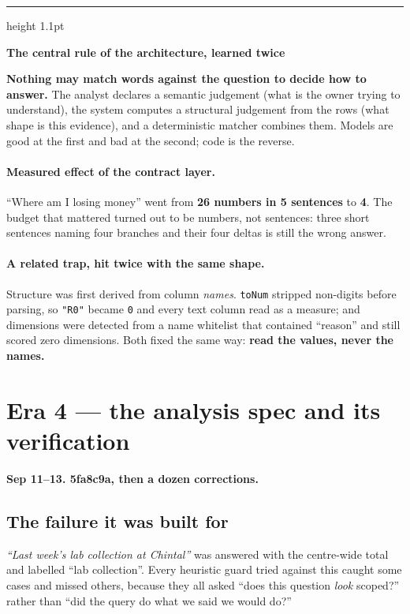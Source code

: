 \documentclass[11pt,a4paper]{report}
\newcommand{\code}[1]{\texttt{\small #1}}
\newcommand{\sha}[1]{{\ttfamily\small\color{slate}#1}}
\newenvironment{keybox}[1]
 {\par\medskip\begin{center}\begin{minipage}{0.94\textwidth}%
  {\color{navy}\hrule height 1.1pt}\vspace{5pt}\par
  \textbf{\color{navy}#1}\par\vspace{3pt}\small}
 {\par\vspace{5pt}{\color{mist}\hrule height 0.8pt}\end{minipage}\end{center}\medskip}
\begin{document}
\begin{keybox}{The central rule of the architecture, learned twice}
\textbf{Nothing may match words against the question to decide how to answer.} The analyst declares
a semantic judgement (what is the owner trying to understand), the system computes a structural
judgement from the rows (what shape is this evidence), and a deterministic matcher combines them.
Models are good at the first and bad at the second; code is the reverse.
\end{keybox}

\paragraph{Measured effect of the contract layer.} ``Where am I losing money'' went from
\textbf{26 numbers in 5 sentences} to \textbf{4}. The budget that mattered turned out to be
numbers, not sentences: three short sentences naming four branches and their four deltas is still
the wrong answer.

\paragraph{A related trap, hit twice with the same shape.} Structure was first derived from column
\emph{names}. \code{toNum} stripped non-digits before parsing, so \code{"R0"} became \code{0} and
every text column read as a measure; and dimensions were detected from a name whitelist that
contained ``reason'' and still scored zero dimensions. Both fixed the same way: \textbf{read the
values, never the names.}

\section{Era 4 --- the analysis spec and its verification}
\label{sec:era4}

\textbf{Sep 11--13. \sha{5fa8c9a}, then a dozen corrections.}

\subsection{The failure it was built for}

\emph{``Last week's lab collection at Chintal''} was answered with the centre-wide total and
labelled ``lab collection''. Every heuristic guard tried against this caught some cases and missed
others, because they all asked ``does this question \emph{look} scoped?'' rather than ``did the
query do what we said we would do?''
\end{document}

